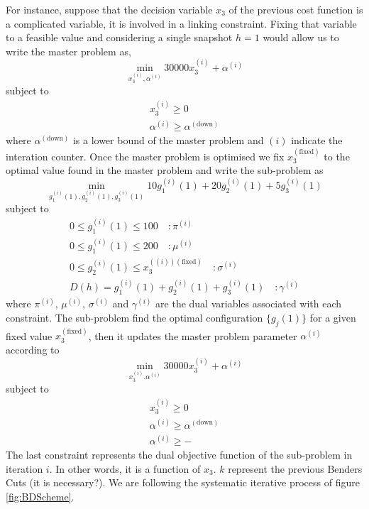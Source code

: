  For instance, suppose that the decision variable $x_{3}$ of the previous cost function is a complicated variable, it is involved in a linking constraint. Fixing that variable to a feasible value and considering a single snapshot $h=1$ would allow us to write the master problem as,
\begin{equation}
    \min_{x_{3}^{(i)}, \alpha^{(i)}} 30000x_{3}^{(i)} + \alpha^{(i)}
\end{equation}
subject to
\begin{align}
    x_{3}^{(i)} \geq 0 \\
    \alpha^{(i)} \geq \alpha^{(\text{down})}
\end{align}
where $\alpha^{(\text{down})}$ is a lower bound of the master problem and $(i)$ indicate the interation counter. Once the master problem is optimised we fix $x_{3}^{(\text{fixed})}$ to the optimal value found in the master problem and write the sub-problem as
\begin{equation}
    \min_{g_{1}^{(i)}(1), g_{2}^{(i)}(1), g_{3}^{(i)}(1)} 10g_{1}^{(i)}(1)+20g_{2}^{(i)}(1) + 5g_{3}^{(i)}(1)
\end{equation}
subject to
\begin{align}
    0 \leq g_{1}^{(i)}(1) \leq 100 \quad :\pi^{(i)} \\
    0 \leq g_{1}^{(i)}(1) \leq 200 \quad :\mu^{(i)} \\
    0 \leq g_{2}^{(i)}(1) \leq x_{3}^{((i))(\text{fixed})} \quad :\sigma^{(i)} \\
    D(h) = g_{1}^{(i)}(1) + g_{2}^{(i)}(1) + g_{3}^{(i)}(1) \quad :\gamma^{(i)}
\end{align}
where $\pi^{(i)}$, $\mu^{(i)}$, $\sigma^{(i)}$ and $\gamma^{(i)}$ are the dual variables associated with each constraint. The sub-problem find the optimal configuration $\{g_{j}(1)\}$ for a given fixed value $x_{3}^{(\text{fixed})}$, then it updates the master problem parameter $\alpha^{(i)}$ according to
\begin{equation}
    \min_{x_{3}^{(i)}. \alpha^{(i)}} 30000x_{3}^{(i)} + \alpha^{(i)}
\end{equation}
subject to
\begin{align}
    x_{3}^{(i)} \geq 0 \\
    \alpha^{(i)} \geq \alpha^{(\text{down})}\\
    \alpha^{(i)} \geq -\
\end{align}
The last constraint represents the dual objective function of the sub-problem in iteration $i$. In other words, it is a function of $x_{3}$. $k$ represent the previous Benders Cuts (it is necessary?). We are following the systematic iterative process of figure \ref{fig:BDScheme}.

